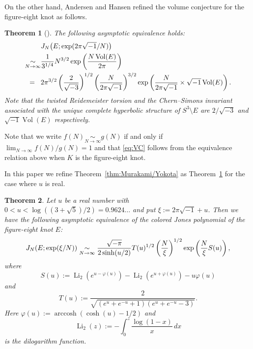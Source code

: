 \documentclass[a4paper]{amsart}
\theoremstyle{plain}
\newtheorem{thm}{Theorem}[section]
\theoremstyle{definition}
\theoremstyle{remark}
\newcommand{\Vol}{\operatorname{Vol}}
\newcommand{\Li}{\operatorname{Li}}
\newcommand{\arccosh}{\operatorname{arccosh}}
\numberwithin{equation}{section}
\begin{document}
On the other hand, Andersen and Hansen \cite[Theorem~1]{Andersen/Hansen:JKNOT2006} refined the volume conjecture for the figure-eight knot as follows.
\begin{thm}[\cite{Andersen/Hansen:JKNOT2006}]\label{thm:Andersen/Hansen}
The following asymptotic equivalence holds:
\begin{equation*}
\begin{split}
  &J_N\bigl(E;\exp(2\pi\sqrt{-1}/N)\bigr)
  \\
  \underset{N\to\infty}{\sim}&
  \frac{1}{3^{1/4}}
  N^{3/2}
  \exp\left(\frac{N\Vol(E)}{2\pi}\right)
  \\
  =\hspace{3mm}&
  2\pi^{3/2}
  \left(\frac{2}{\sqrt{-3}}\right)^{1/2}
  \left(\frac{N}{2\pi\sqrt{-1}}\right)^{3/2}
  \exp\left(\frac{N}{2\pi\sqrt{-1}}\times\sqrt{-1}\Vol(E)\right).
\end{split}
\end{equation*}
Note that the twisted Reidemeister torsion and the Chern--Simons invariant associated with the unique complete hyperbolic structure of $S^3\setminus{E}$ are $2/\sqrt{-3}$ and $\sqrt{-1}\Vol(E)$ respectively.
\end{thm}
Note that we write $f(N)\underset{N\to\infty}{\sim}g(N)$ if and only if $\lim_{N\to\infty}f(N)/g(N)=1$ and that \eqref{eq:VC} follows from the equivalence relation above when $K$ is the figure-eight knot.
\par
In this paper we refine Theorem~\ref{thm:Murakami/Yokota} as Theorem~\ref{thm:Andersen/Hansen} for the case where $u$ is real.
\begin{thm}\label{thm:main}
Let $u$ be a real number with $0<u<\log((3+\sqrt{5})/2)=0.9624\dots$ and put $\xi:=2\pi\sqrt{-1}+u$.
Then we have the following asymptotic equivalence of the colored Jones polynomial of the figure-eight knot $E$:
\begin{equation}\label{eq:main}
  J_N(E;\exp(\xi/N))
  \\
  \underset{N\to\infty}{\sim}
  \frac{\sqrt{-\pi}}{2\sinh(u/2)}
  T(u)^{1/2}
  \left(\frac{N}{\xi}\right)^{1/2}
  \exp\left(\frac{N}{\xi}S(u)\right),
\end{equation}
where
\begin{equation*}
  S(u)
  :=
  \Li_2(e^{u-\varphi(u)})-\Li_2(e^{u+\varphi(u)})-u\varphi(u)
\end{equation*}
and
\begin{equation*}
  T(u)
  :=
  \frac{2}{\sqrt{(e^u+e^{-u}+1)(e^u+e^{-u}-3)}}.
\end{equation*}
Here $\varphi(u):=\arccosh(\cosh(u)-1/2)$ and 
\begin{equation*}
  \Li_2(z)
  :=
  -\int_{0}^{z}\frac{\log(1-x)}{x}\,dx
\end{equation*}
is the dilogarithm function.
\end{thm}
\end{document}
